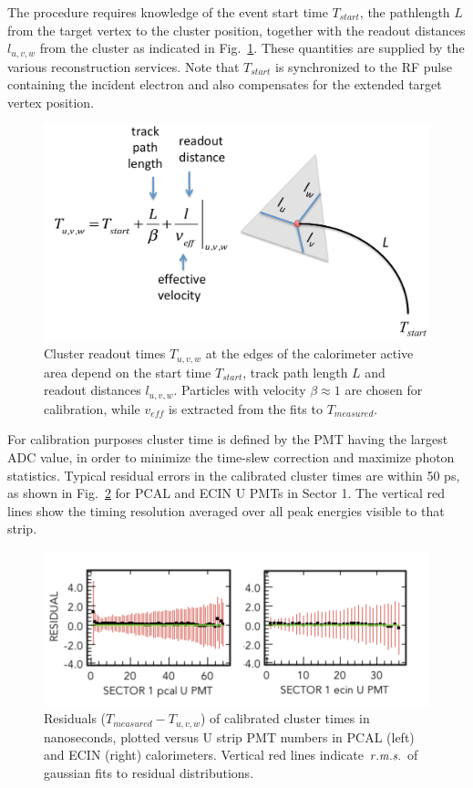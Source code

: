 The procedure requires knowledge of the event start time $T_{start}$, the pathlength $L$ from the target vertex to the cluster position, together with the readout distances $l_{u,v,w}$ from the cluster as indicated in Fig.~\ref{fig:S9_2_0}.  These quantities are supplied by the various reconstruction services.  Note that $T_{start}$ is synchronized to the RF pulse containing the incident electron and also compensates for the extended target vertex position.

\begin{figure}[hbt]
\centering
\includegraphics[width=1.0\columnwidth,keepaspectratio]{img/S9_2_0.png}
\caption[]{Cluster readout times $T_{u,v,w}$ at the edges of the calorimeter active area depend on the start time $T_{start}$, track path length $L$ and readout distances $l_{u,v,w}$.  Particles with velocity $\beta\approx 1$ are chosen for calibration, while $v_{eff}$ is extracted from the fits to $T_{measured}$.}
\label{fig:S9_2_0}
\end{figure}

For calibration purposes cluster time is defined by the PMT having the largest ADC value, in order to minimize the time-slew correction and maximize photon statistics.  Typical residual errors in the calibrated cluster times are within 50 ps, as shown in Fig.~\ref{fig:S9_2_1} for PCAL and ECIN U PMTs in Sector 1.  The vertical red lines show 
the timing resolution averaged over all peak energies visible to that strip.  

\begin{figure}[hbt]
\centering
\includegraphics[width=1.0\columnwidth,keepaspectratio]{img/S9_2_1.png}
\caption[]{Residuals ($T_{measured}-T_{u,v,w}$) of calibrated cluster times in nanoseconds, plotted versus U strip PMT numbers in PCAL (left) and ECIN (right) calorimeters.  Vertical red lines indicate $\it{r.m.s.}$ of gaussian fits to residual distributions.}  
\label{fig:S9_2_1}
\end{figure}

